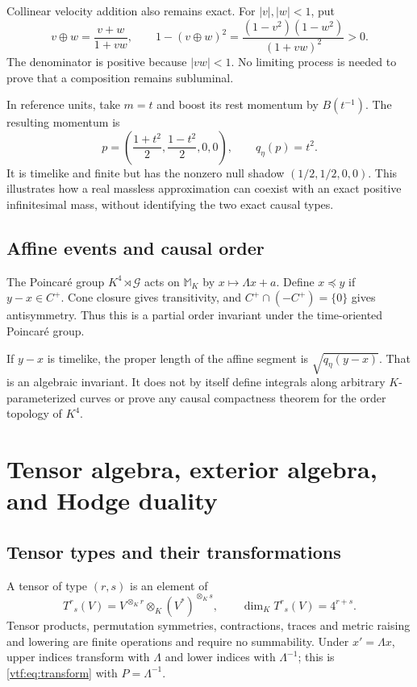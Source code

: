 \documentclass[11pt,letterpaper]{article}
\theoremstyle{definition}
\theoremstyle{remark}
\newcommand{\M}{\mathbb M}
\begin{document}
Collinear velocity addition also remains exact. For $|v|,|w|<1$, put
\begin{equation}
 v\oplus w=\frac{v+w}{1+vw},\qquad
 1-(v\oplus w)^2=\frac{(1-v^2)(1-w^2)}{(1+vw)^2}>0.
\end{equation}
The denominator is positive because $|vw|<1$. No limiting process is needed to prove that a composition remains subluminal.

In reference units, take $m=t$ and boost its rest momentum by $B(t^{-1})$. The resulting momentum is
\begin{equation}
 p=\left(\frac{1+t^2}{2},\frac{1-t^2}{2},0,0\right),
 \qquad q_\eta(p)=t^2.
\end{equation}
It is timelike and finite but has the nonzero null shadow $(1/2,1/2,0,0)$. This illustrates how a real massless approximation can coexist with an exact positive infinitesimal mass, without identifying the two exact causal types.

\subsection{Affine events and causal order}
The Poincar\'e group $K^4\rtimes\mathcal G$ acts on $\M_K$ by $x\mapsto\Lambda x+a$. Define $x\preceq y$ if $y-x\in C^+$. Cone closure gives transitivity, and $C^+\cap(-C^+)=\{0\}$ gives antisymmetry. Thus this is a partial order invariant under the time-oriented Poincar\'e group.

If $y-x$ is timelike, the proper length of the affine segment is $\sqrt{q_\eta(y-x)}$. That is an algebraic invariant. It does not by itself define integrals along arbitrary $K$-parameterized curves or prove any causal compactness theorem for the order topology of $K^4$.

\section{Tensor algebra, exterior algebra, and Hodge duality}\label{vtf:mink:sec:tensors}

\subsection{Tensor types and their transformations}
A tensor of type $(r,s)$ is an element of
\begin{equation}
 T^r{}_s(V)=V^{\otimes_K r}\otimes_K(V^*)^{\otimes_K s},
 \qquad \dim_K T^r{}_s(V)=4^{r+s}.
\end{equation}
Tensor products, permutation symmetries, contractions, traces and metric raising
and lowering are finite operations and require no summability. Under
$x'=\Lambda x$, upper indices transform with $\Lambda$ and lower indices with
$\Lambda^{-1}$; this is \eqref{vtf:eq:transform} with $P=\Lambda^{-1}$.
\end{document}
